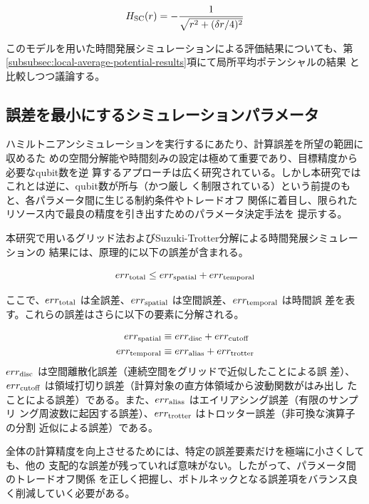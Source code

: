 \documentclass[wabun2025.tex]{subfiles}
\begin{document}
\begin{equation}
H_{\mathrm{SC}}(r) = - \frac{1}{\sqrt{r^2+(\delta r/4)^2}}
\label{eq:Hsc2r-fixed}
\end{equation}

このモデルを用いた時間発展シミュレーションによる評価結果についても、第
\ref{subsubsec:local-average-potential-results}項にて局所平均ポテンシャルの結果
と比較しつつ議論する。

\subsection{誤差を最小にするシミュレーションパラメータ}
\label{sec:parameter-selection-for-minimum-error}

ハミルトニアンシミュレーションを実行するにあたり、計算誤差を所望の範囲に収めるた
めの空間分解能や時間刻みの設定は極めて重要であり、目標精度から必要なqubit数を逆
算するアプローチは広く研究されている\cite{FEIT1982412, Kivlichan_2017,
Chan2023.sciadv.abo7484}。しかし本研究ではこれとは逆に、qubit数が所与（かつ厳し
く制限されている）という前提のもと、各パラメータ間に生じる制約条件やトレードオフ
関係に着目し、限られたリソース内で最良の精度を引き出すためのパラメータ決定手法を
提示する。

本研究で用いるグリッド法およびSuzuki-Trotter分解による時間発展シミュレーションの
結果には、原理的に以下の誤差が含まれる。

\begin{equation}
err_{\mathrm{total}} \leq err_{\mathrm{spatial}} + err_{\mathrm{temporal}}
\label{eq:error-total-decomposition}
\end{equation}

ここで、$err_{\mathrm{total}}$ は全誤差、$err_{\mathrm{spatial}}$ は空間誤差、$err_{\mathrm{temporal}}$ は時間誤
差を表す。これらの誤差はさらに以下の要素に分解される。

\begin{align}
    err_{\mathrm{spatial}} &\equiv err_{\mathrm{disc}} + err_{\mathrm{cutoff}} \\
    err_{\mathrm{temporal}} &\equiv err_{\mathrm{alias}} + err_{\mathrm{trotter}}
\end{align}
$err_{\mathrm{disc}}$ は空間離散化誤差（連続空間をグリッドで近似したことによる誤
差）、$err_{\mathrm{cutoff}}$ は領域打切り誤差（計算対象の直方体領域から波動関数がはみ出し
たことによる誤差）である。また、$err_{\mathrm{alias}}$ はエイリアシング誤差（有限のサンプリ
ング周波数に起因する誤差）、$err_{\mathrm{trotter}}$ はトロッター誤差（非可換な演算子の分割
近似による誤差）である。

全体の計算精度を向上させるためには、特定の誤差要素だけを極端に小さくしても、他の
支配的な誤差が残っていれば意味がない。したがって、パラメータ間のトレードオフ関係
を正しく把握し、ボトルネックとなる誤差項をバランス良く削減していく必要がある。
\end{document}

